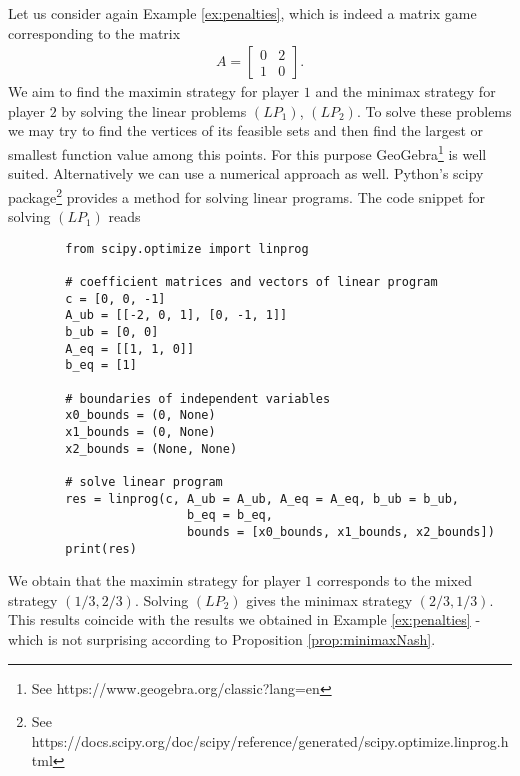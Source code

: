\begin{example}
    Let us consider again Example \ref{ex:penalties}, which is indeed a matrix game corresponding to the matrix 
    \begin{align*}
        A = 
        \begin{bmatrix}
            0 & 2\\
            1 & 0
        \end{bmatrix}.
    \end{align*}
    We aim to find the maximin strategy for player $1$ and the minimax strategy for player $2$ by solving the linear problems $(LP_{1})$, $(LP_{2})$.
    To solve these problems we may try to find the vertices of its feasible sets and then find the largest or smallest function value among this points. For this
    purpose GeoGebra\footnote{See https://www.geogebra.org/classic?lang=en} is well suited. Alternatively we can use a numerical approach as well. Python's scipy
    package\footnote{See https://docs.scipy.org/doc/scipy/reference/generated/scipy.optimize.linprog.html} provides a method for solving linear programs. The 
    code snippet for solving $(LP_{1})$ reads

    \begin{lstlisting}
        from scipy.optimize import linprog    

        # coefficient matrices and vectors of linear program
        c = [0, 0, -1]
        A_ub = [[-2, 0, 1], [0, -1, 1]]
        b_ub = [0, 0]
        A_eq = [[1, 1, 0]]            
        b_eq = [1]

        # boundaries of independent variables
        x0_bounds = (0, None)
        x1_bounds = (0, None)
        x2_bounds = (None, None)

        # solve linear program
        res = linprog(c, A_ub = A_ub, A_eq = A_eq, b_ub = b_ub,
                         b_eq = b_eq, 
                         bounds = [x0_bounds, x1_bounds, x2_bounds])
        print(res)
    \end{lstlisting}
    We obtain that the maximin strategy for player $1$ corresponds to the mixed strategy $(1 / 3, 2 / 3)$. Solving $(LP_{2})$ gives the minimax
    strategy $(2 / 3, 1 / 3)$. This results coincide with the results we obtained in Example \ref{ex:penalties} - which is not surprising according 
    to Proposition \ref{prop:minimaxNash}.
\end{example}
